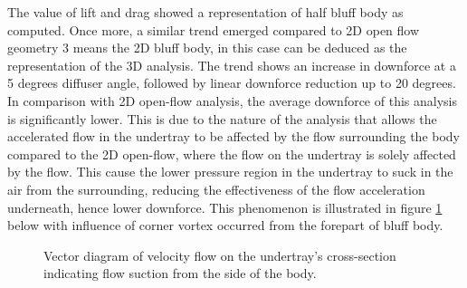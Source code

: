 \noindent The value of lift and drag showed a representation of half bluff body as computed. Once more, a similar trend emerged compared to 2D open flow geometry 3 means the 2D bluff body, in this case can be deduced as the representation of the 3D analysis.  The trend shows an increase in downforce at a 5 degrees diffuser angle, followed by linear downforce reduction up to 20 degrees.  In comparison with 2D open-flow analysis, the average downforce of this analysis is significantly lower. This is due to the nature of the analysis that allows the accelerated flow in the undertray to be affected by the flow surrounding the body compared to the 2D open-flow, where the flow on the undertray is solely affected by the flow. This cause the lower pressure region in the undertray to suck in the air from the surrounding,  reducing the effectiveness of the flow acceleration underneath, hence lower downforce. This phenomenon is illustrated in figure \ref{fig:Vector_suction_diagram} below with influence of corner vortex occurred from the forepart of bluff body. 

\begin{figure}[!htb]
    \centering
    \noindent{}
    \caption{Vector diagram of velocity flow on the undertray's cross-section indicating flow suction from the side of the body.}
    \label{fig:Vector_suction_diagram}
\end{figure}


